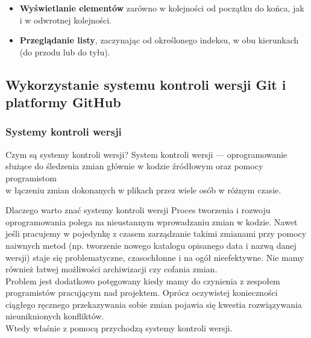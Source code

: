 \begin{itemize}
  \item \textbf{Wyświetlanie elementów} zarówno w kolejności od początku do końca, jak i w odwrotnej kolejności.

  \item \textbf{Przeglądanie listy}, zaczynając od określonego indeksu, w obu kierunkach (do przodu lub do tyłu).
\end{itemize}

\newpage

\subsection{Wykorzystanie systemu kontroli wersji Git i platformy GitHub}

\subsubsection[Systemy kontroli wersji]{Systemy kontroli wersji~\cite{ProGit}}

Czym są systemy kontroli wersji?
System kontroli wersji — oprogramowanie służące do śledzenia zmian głównie w kodzie źródłowym oraz pomocy programistom \\ w łączeniu zmian dokonanych w plikach przez wiele osób w różnym czasie.

Dlaczego warto znać systemy kontroli wersji
Proces tworzenia i rozwoju oprogramowania polega na nieustannym wprowadzaniu zmian w kodzie. Nawet jeśli pracujemy w pojedynkę z czasem zarządzanie takimi zmianami przy pomocy naiwnych metod (np. tworzenie nowego katalogu opisanego data i nazwą danej \\ wersji) staje się problematyczne, czasochłonne i na ogół nieefektywne. Nie mamy również łatwej możliwości archiwizacji czy cofania zmian. \\ Problem jest dodatkowo potęgowany kiedy mamy do czynienia z zespołem programistów pracującym nad projektem. Oprócz oczywistej konieczności ciągłego ręcznego przekazywania sobie zmian pojawia się kwestia rozwiązywania nieuniknionych konfliktów. \\ Wtedy właśnie z pomocą przychodzą systemy kontroli wersji.


